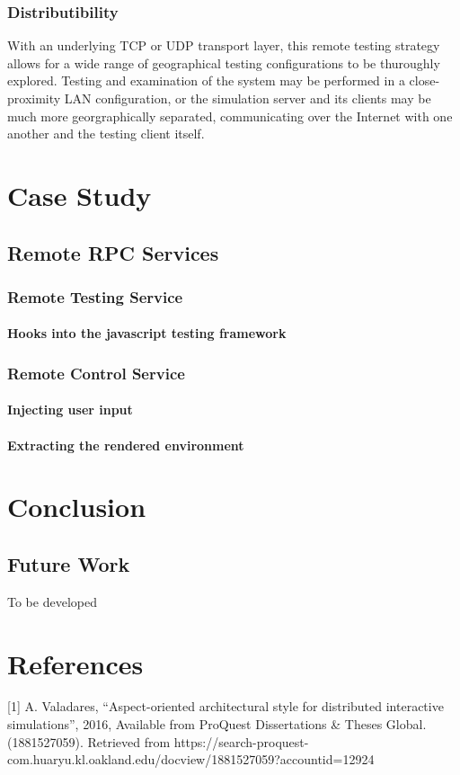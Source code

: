 \documentclass[conference]{IEEEtran}
\begin{document}
\subsubsection{Distributibility}With an underlying TCP or UDP transport layer, this remote testing strategy allows for a wide range of geographical testing configurations to be thuroughly explored. Testing and examination of the system may be performed in a close-proximity LAN configuration, or the simulation server and its clients may be much more georgraphically separated, communicating over the Internet with one another and the testing client itself.

\section{Case Study}
\subsection{Remote RPC Services}
\subsubsection{Remote Testing Service}
\paragraph{Hooks into the javascript testing framework}
\subsubsection{Remote Control Service}
\paragraph{Injecting user input}
\paragraph{Extracting the rendered environment}


\section{Conclusion}
\subsection{Future Work}

To be developed

\section{References}
[1] A. Valadares, “Aspect-oriented architectural style for distributed interactive simulations”, 2016,
Available from ProQuest Dissertations \& Theses Global. (1881527059).
Retrieved from https://search-proquest-com.huaryu.kl.oakland.edu/docview/1881527059?accountid=12924
\end{document}
